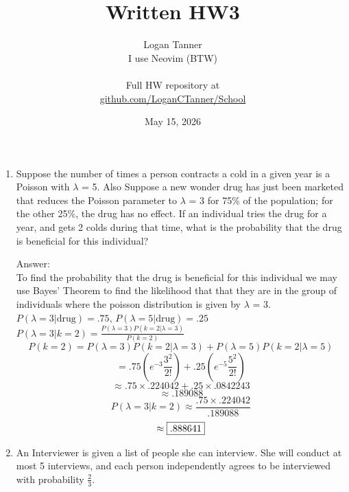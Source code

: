 \documentclass{article}
\title{Written HW3}
\author{
    Logan Tanner \\ 
    I use Neovim (BTW) \\ 
    \\
    Full HW repository at \\
    \href{https://github.com/LoganCTanner/School/tree/main/Math/425-Probability}{github.com/LoganCTanner/School}
}
\date{May 15, 2026}
\begin{document}
\maketitle

\clearpage
\begin{enumerate}

    \item   Suppose the number of times a person contracts a cold in a given year is a Poisson with $\lambda$ = 5.
            Also Suppose a new wonder drug has just been marketed that reduces the Poisson parameter to $\lambda$ = 3
            for 75\% of the population; for the other 25\%, the drug has no effect. If an individual tries the drug 
            for a year, and gets 2 colds during that time, what is the probability that the drug is beneficial for 
            this individual?

            
            Answer:\\
            To find the probability that the drug is beneficial for this individual we may use Bayes' Theorem to find
            the likelihood that that they are in the group of individuals where the 
            poisson distribution is given by $\lambda$ = 3.\\
            $ P(\lambda = 3 | \text{drug}) = .75\text{, } P(\lambda = 5 | \text{drug}) = .25$\\
            $ P(\lambda = 3 | k = 2) = \frac{P(\lambda = 3)P(k=2 | \lambda=3)}{P(k = 2)} $
            $$ P(k = 2) = P(\lambda = 3)P(k=2 | \lambda=3) + P(\lambda=5)P(k = 2 | \lambda=5) $$
            $$ = .75\left(e^{-3}\frac{3^2}{2!}\right) + .25\left(e^{-5}\frac{5^2}{2!}\right) $$
            $$ \approx .75\times.224042 + .25\times.0842243 $$
            $$ \approx .189088 $$
            $$ P(\lambda = 3 | k = 2) \approx \frac{.75 \times .224042}{.189088} $$
            $$ \approx \fbox{.888641} $$

    \clearpage
    \item   An Interviewer is given a list of people she can interview. She will conduct at most 5 interviews, 
            and each person independently agrees to be interviewed with probability $\frac{2}{3}$.
            

\end{enumerate}
\end{document}
